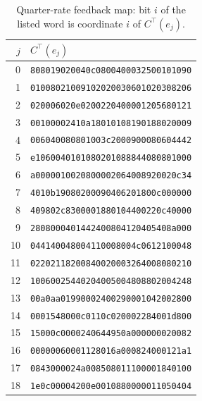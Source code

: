 \begin{table}[tb]
\centering
\caption{Quarter-rate feedback map: bit $i$ of the listed word is
coordinate $i$ of $C^\top(e_j)$.}
\label{tab:finite-quarter-feedback}
\scriptsize
\begin{tabular}{@{}rl@{}}
\toprule
$j$ & $C^\top(e_j)$\\
\midrule
0 & \texttt{808019020040c0800400032500101090}\\
1 & \texttt{01008021009102020030601020308206}\\
2 & \texttt{020006020e0200220400001205680121}\\
3 & \texttt{00100002410a18010108190188020009}\\
4 & \texttt{006040080801003c2000900080604442}\\
5 & \texttt{e1060040101080201088844080801000}\\
6 & \texttt{a0000010020800002064008920020c34}\\
7 & \texttt{4010b19080200090406201800c000000}\\
8 & \texttt{409802c8300001880104400220c40000}\\
9 & \texttt{2808000401442400804120405408a000}\\
10 & \texttt{044140048004110008004c0612100048}\\
11 & \texttt{02202118200840020003264008080210}\\
12 & \texttt{10060025440204005004808802004248}\\
13 & \texttt{00a0aa01990002400290001042002800}\\
14 & \texttt{0001548000c0110c020002284001d800}\\
15 & \texttt{15000c0000240644950a000000020082}\\
16 & \texttt{00000060001128016a000824000121a1}\\
17 & \texttt{0843000024a008508011100001840100}\\
18 & \texttt{1e0c00004200e0010880000011050404}\\
\bottomrule
\end{tabular}
\end{table}

